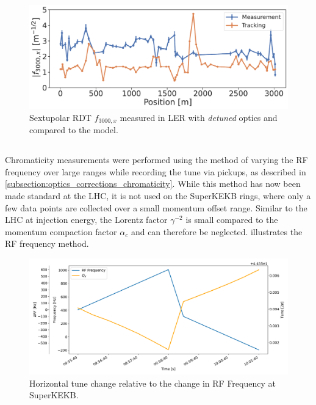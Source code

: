 \begin{figure}[!htb]
    \centering
    \includegraphics[width=0.8\linewidth]{images/kek/f3000x_LER.pdf}
    \caption{Sextupolar RDT $f_{3000,x}$ measured in LER with \textit{detuned} optics and compared
    to the model.}
    \label{fig:kek:rdt_f3000x_LER}
\end{figure}



\FloatBarrier
\subsection{}

Chromaticity measurements were performed using the method of varying the RF frequency over large
ranges while recording the tune via pickups, as described in
\cref{subsection:optics_corrections_chromaticity}. While this method has now been made standard at
the LHC, it is not used on the SuperKEKB rings, where only a few data points are collected over a
small momentum offset range.
Similar to the LHC at injection energy, the Lorentz factor $\gamma^{-2}$ is small compared to the
momentum compaction factor $\alpha_c$ and can therefore be neglected.
 illustrates the RF frequency method.

\begin{figure}[!htb]
    \centering
    \includegraphics[width=0.8\linewidth]{images/kek/rf_qx.png}
    \caption{Horizontal tune change relative to the change in RF Frequency at SuperKEKB.}
    \label{fig:kek:chroma_procedure}
\end{figure}

